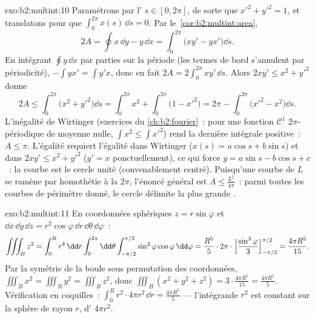 \begin{solution}{exo:b2:multint:10}
Paramétrons par l' $s \in [0, 2\pi]$, de sorte que
$x'^2 + y'^2 = 1$, et translatons pour que $\int_0^{2\pi} x(s)\,\dd s = 0$. Par
le~\cref{cor:b2:multint:area},
\[
2A = \oint x\,\dd y - y\,\dd x
= \int_0^{2\pi}\bigl(xy' - yx'\bigr)\dd s .
\]
En intégrant $\oint y\,\dd x$ par parties sur la période (les termes de
bord s'annulent par périodicité), $-\int yx' = \int y'x$, donc en fait
$2A = 2\int_0^{2\pi}xy'\,\dd s$. Alors $2xy' \leq x^2 + y'^2$
donne
\[
2A \leq \int_0^{2\pi}\bigl(x^2 + y'^2\bigr)\dd s
= \int_0^{2\pi} x^2 + \int_0^{2\pi}\bigl(1 - x'^2\bigr)
= 2\pi - \int_0^{2\pi}\bigl(x'^2 - x^2\bigr)\dd s .
\]
L'inégalité de Wirtinger (exercices du \cref{ch:b2:fourier}~: pour une
fonction $\mathcal{C}^1$ $2\pi$-périodique de moyenne nulle,
$\int x^2 \leq \int x'^2$) rend la dernière intégrale positive~:
$A \leq \pi$. L'égalité requiert l'égalité dans Wirtinger ($x(s) =
a\cos s + b\sin s$) et dans $2xy' \leq x^2 + y'^2$ ($y' = x$
ponctuellement), ce qui force $y = a\sin s - b\cos s + c$~: la courbe est
le cercle unité (convenablement centré). Puisqu'une courbe de  $L$
se ramène par homothétie à la  $2\pi$, l'énoncé général est $A \leq
\frac{L^2}{4\pi}$~: parmi toutes les courbes  de périmètre donné, le
cercle délimite la plus grande .
\end{solution}

\begin{solution}{exo:b2:multint:11}
En coordonnées sphériques $z = r\sin\varphi$ et $\dd x\,\dd
y\,\dd z = r^2\cos\varphi\,\dd r\,\dd\theta\,\dd\varphi$~:
\[
\iiint_B z^2
= \int_0^R r^4\,\dd r\int_0^{2\pi}\dd\theta
\int_{-\pi/2}^{\pi/2}\sin^2\varphi\cos\varphi\,\dd\varphi
= \frac{R^5}5\cdot2\pi\cdot
\Bigl[\frac{\sin^3\varphi}3\Bigr]_{-\pi/2}^{\pi/2}
= \frac{4\pi R^5}{15}.
\]
Par la symétrie de la boule sous permutation des coordonnées,
$\iiint_B x^2 = \iiint_B y^2 = \iiint_B z^2$, donc $\iiint_B(x^2
+ y^2 + z^2) = 3\cdot\frac{4\pi R^5}{15} = \frac{4\pi R^5}5$.
Vérification en coquilles~: $\int_0^R r^2\cdot 4\pi r^2\,\dd r = \frac{4\pi
R^5}5$ --- l'intégrande $r^2$ est constant sur la sphère de
rayon $r$, d' $4\pi r^2$.
\end{solution}

